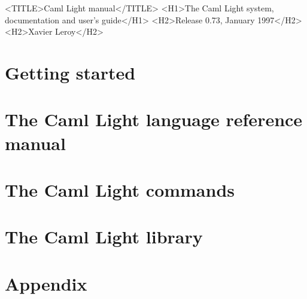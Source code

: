 \begin{rawhtml}
  <TITLE>Caml Light manual</TITLE>
  <H1>The Caml Light system, documentation and user's guide</H1>
  <H2>Release 0.73, January 1997</H2>
  <H2>Xavier Leroy</H2>
\end{rawhtml}



\part{Getting started} \label{p:gettingstarted}


\part{The Caml Light language reference manual} \label{p:refman}



\part{The Caml Light commands} \label{p:commands}










\part{The Caml Light library} \label{p:library}







\part{Appendix} \label{p:appendix}

